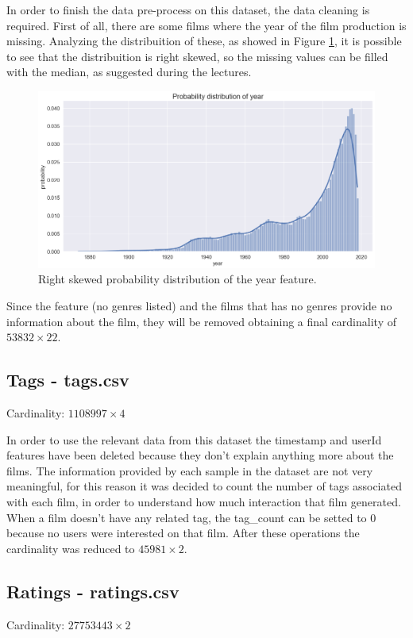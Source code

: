 \documentclass[../main]{subfiles}
\begin{document}
In order to finish the data pre-process on this dataset, the data cleaning is required.
First of all, there are some films where the year of the film production is missing.
Analyzing the distribuition of these, as showed in Figure \ref{fig:year_distribution_missing}, it is possible to see that the distribuition is right skewed, so the missing values can be filled with the median, as suggested during the lectures.
\begin{figure}[h]
    \includegraphics[width=\linewidth]{figures/year_distribution_missing.png}
    \caption{Right skewed probability distribution of the year feature.}
    \label{fig:year_distribution_missing}
\end{figure}

Since the feature (no genres listed) and the films that has no genres provide no information about the film, they will be removed obtaining a final cardinality of $53832 \times 22$.

\subsection*{Tags - tags.csv}
Cardinality: $1108997 \times 4$

In order to use the relevant data from this dataset the timestamp and userId features have been deleted because they don't explain anything more about the films.
The information provided by each sample in the dataset are not very meaningful, for this reason it was decided to count the number of tags associated with each film, in order to understand how much interaction that film generated.
When a film doesn't have any related tag, the tag\_count can be setted to 0 because no users were interested on that film.
After these operations the cardinality was reduced to $45981 \times 2$.

\subsection*{Ratings - ratings.csv}
Cardinality: $27753443 \times 2$
\end{document}
